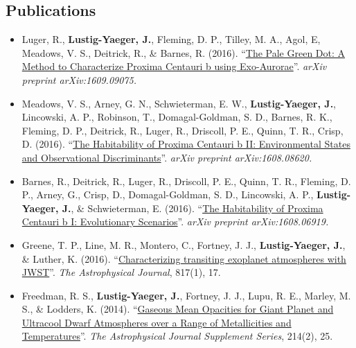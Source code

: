 \documentclass[margin,10pt]{res}
\begin{document}
\begin{resume}
\section{Publications} 
                \begin{itemize}  
                    \item Luger, R., \textbf{Lustig-Yaeger, J.}, Fleming, D. P., Tilley, M. A., Agol, E, Meadows, V. S., Deitrick, R., \& Barnes, R. (2016). ``\href{http://adsabs.harvard.edu/abs/2016arXiv160909075L}{The Pale Green Dot: A Method to Characterize Proxima Centauri b using Exo-Aurorae}''. \textit{arXiv preprint arXiv:1609.09075.}
                    \item Meadows, V. S., Arney, G. N., Schwieterman, E. W., \textbf{Lustig-Yaeger, J.}, Lincowski, A. P., Robinson, T.,  Domagal-Goldman, S. D., Barnes, R. K., Fleming, D. P., Deitrick, R., Luger, R., Driscoll, P. E., Quinn, T. R., Crisp, D. (2016). ``\href{http://adsabs.harvard.edu/cgi-bin/bib_query?arXiv:1608.08620}{The Habitability of Proxima Centauri b II: Environmental States and Observational Discriminants}''. \textit{arXiv preprint arXiv:1608.08620.}
                    \item Barnes, R., Deitrick, R., Luger, R., Driscoll, P. E., Quinn, T. R., Fleming, D. P., Arney, G., Crisp, D., Domagal-Goldman, S. D., Lincowski, A. P., \textbf{Lustig-Yaeger, J.}, \& Schwieterman, E. (2016). ``\href{http://adsabs.harvard.edu/cgi-bin/bib_query?arXiv:1608.06919}{The Habitability of Proxima Centauri b I: Evolutionary Scenarios}''. \textit{arXiv preprint arXiv:1608.06919.}
                    \item Greene, T. P., Line, M. R., Montero, C., Fortney, J. J., \textbf{Lustig-Yaeger, J.}, \& Luther, K. (2016). ``\href{http://adsabs.harvard.edu/abs/2016ApJ...817...17G}{Characterizing transiting exoplanet atmospheres with JWST}''. \textit{The Astrophysical Journal}, 817(1), 17.
                    \item Freedman, R. S., \textbf{Lustig-Yaeger, J.}, Fortney, J. J., Lupu, R. E., Marley, M. S., \& Lodders, K. (2014). ``\href{http://adsabs.harvard.edu/abs/2014ApJS..214...25F}{Gaseous Mean Opacities for Giant Planet and Ultracool Dwarf Atmospheres over a Range of Metallicities and Temperatures}''. \textit{The Astrophysical Journal Supplement Series}, 214(2), 25.\\
                 \end{itemize}
                 

\end{resume}
\end{document}
